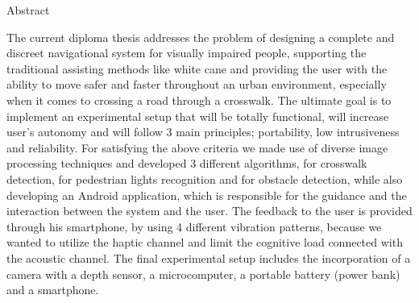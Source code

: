 \pagestyle{plain}
\begin{center}
{\LARGE Abstract}\\[1cm]
\end{center}

The current diploma thesis addresses the problem of designing a complete and discreet navigational system for visually impaired people, supporting the traditional assisting methods like white cane and providing the user with the ability to move safer and faster throughout an urban environment, especially when it comes to crossing a road through a crosswalk. The ultimate goal is to implement an experimental setup that will be totally functional, will increase user's autonomy and will follow 3 main principles; portability, low intrusiveness and reliability. For satisfying the above criteria we made use of diverse image processing techniques and developed 3 different algorithms, for crosswalk detection, for pedestrian lights recognition and for obstacle detection, while also developing an Android application, which is responsible for the guidance and the interaction between the system and the user. The feedback to the user is provided through his smartphone, by using 4 different vibration patterns, because we wanted to utilize the haptic channel and limit the cognitive load connected with the acoustic channel. The final experimental setup includes the incorporation of a camera with a depth sensor, a microcomputer, a portable battery (power bank) and a smartphone.
